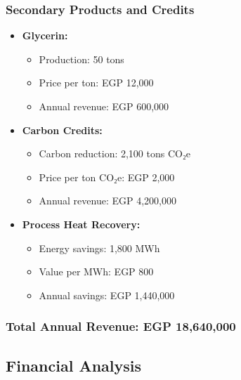 \subsubsection{Secondary Products and Credits}
\begin{itemize}
    \item \textbf{Glycerin:}
    \begin{itemize}
        \item Production: 50 tons
        \item Price per ton: EGP 12,000
        \item Annual revenue: EGP 600,000
    \end{itemize}
    
    \item \textbf{Carbon Credits:}
    \begin{itemize}
        \item Carbon reduction: 2,100 tons CO₂e
        \item Price per ton CO₂e: EGP 2,000
        \item Annual revenue: EGP 4,200,000
    \end{itemize}
    
    \item \textbf{Process Heat Recovery:}
    \begin{itemize}
        \item Energy savings: 1,800 MWh
        \item Value per MWh: EGP 800
        \item Annual savings: EGP 1,440,000
    \end{itemize}
\end{itemize}

\subsubsection{Total Annual Revenue: EGP 18,640,000}

\subsection{Financial Analysis}


